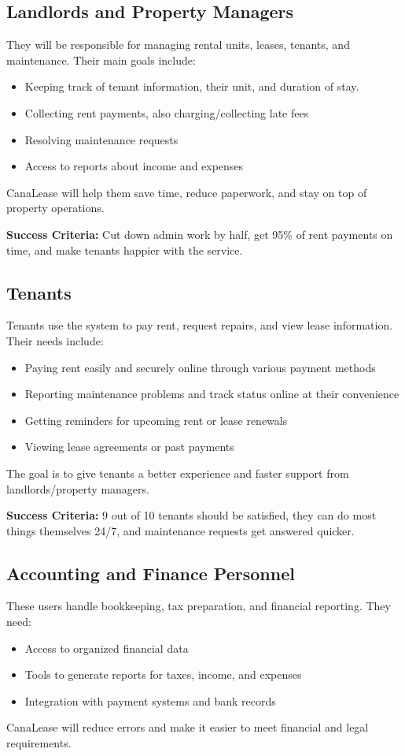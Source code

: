\documentclass[12pt]{article}
\begin{document}
\subsection{Landlords and Property Managers}
They will be responsible for managing rental units, leases, tenants, and maintenance. Their main goals include:
\begin{itemize}
    \item Keeping track of tenant information, their unit, and duration of stay.
    \item Collecting rent payments, also charging/collecting late fees
    \item Resolving maintenance requests
    \item Access to reports about income and expenses
\end{itemize}
CanaLease will help them save time, reduce paperwork, and stay on top of property operations.

\textbf{Success Criteria:} Cut down admin work by half, get 95\% of rent payments on time, and make tenants happier with the service.

\subsection{Tenants}
Tenants use the system to pay rent, request repairs, and view lease information. Their needs include:
\begin{itemize}
    \item Paying rent easily and securely online through various payment methods
    \item Reporting maintenance problems and track status online at their convenience
    \item Getting reminders for upcoming rent or lease renewals
    \item Viewing lease agreements or past payments
\end{itemize}
The goal is to give tenants a better experience and faster support from landlords/property managers.

\textbf{Success Criteria:} 9 out of 10 tenants should be satisfied, they can do most things themselves 24/7, and maintenance requests get answered quicker.

\subsection{Accounting and Finance Personnel}
These users handle bookkeeping, tax preparation, and financial reporting. They need:
\begin{itemize}
    \item Access to organized financial data
    \item Tools to generate reports for taxes, income, and expenses
    \item Integration with payment systems and bank records
\end{itemize}
CanaLease will reduce errors and make it easier to meet financial and legal requirements.
\end{document}
